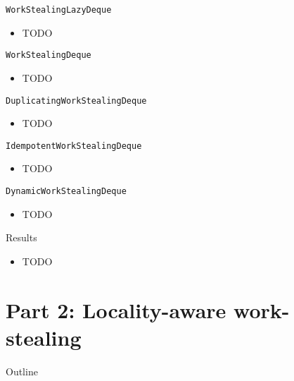 \begin{frame}{\lstinline!WorkStealingLazyDeque!}
  \begin{itemize}
  \item TODO
  \end{itemize}
\end{frame}

\begin{frame}{\lstinline!WorkStealingDeque!}
  \begin{itemize}
  \item TODO
  \end{itemize}
\end{frame}

\begin{frame}{\lstinline!DuplicatingWorkStealingDeque!}
  \begin{itemize}
  \item TODO
  \end{itemize}
\end{frame}

\begin{frame}{\lstinline!IdempotentWorkStealingDeque!}
  \begin{itemize}
  \item TODO
  \end{itemize}
\end{frame}

\begin{frame}{\lstinline!DynamicWorkStealingDeque!}
  \begin{itemize}
  \item TODO
  \end{itemize}
\end{frame}

\begin{frame}{Results}
  \begin{itemize}
  \item TODO
  \end{itemize}
\end{frame}


\section{Part 2: Locality-aware work-stealing}

\begin{frame}{Outline}
  \tableofcontents[current]
\end{frame}

